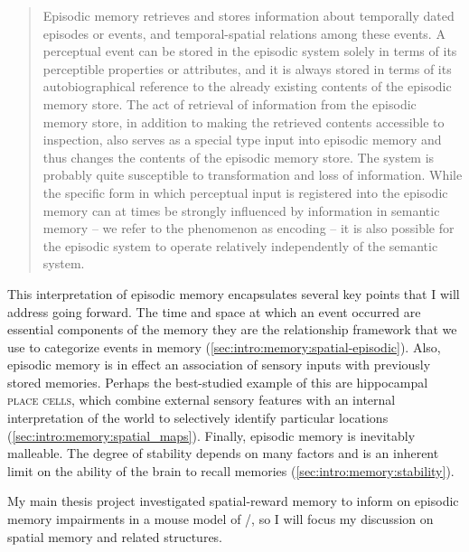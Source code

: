 
\begin{quote}
Episodic memory retrieves and stores information about temporally dated episodes or events, and temporal-spatial relations among these events. A perceptual event can be stored in the episodic system solely in terms of its perceptible properties or attributes, and it is always stored in terms of its autobiographical reference to the already existing contents of the episodic memory store. The act of retrieval of information from the episodic memory store, in addition to making the retrieved contents accessible to inspection, also serves as a special type input into episodic memory and thus changes the contents of the episodic memory store. The system is probably quite susceptible to transformation and loss of information. While the specific form in which perceptual input is registered into the episodic memory can at times be strongly influenced by information in semantic memory -- we refer to the phenomenon as encoding -- it is also possible for the episodic system to operate relatively independently of the semantic system.
\end{quote}

This interpretation of episodic memory encapsulates several key points that I will address going forward.
The time and space at which an event occurred are essential components of the memory they are the relationship framework that we use to categorize events in memory (\autoref{sec:intro:memory:spatial-episodic}).
Also, episodic memory is in effect an association of sensory inputs with previously stored memories.
Perhaps the best-studied example of this are hippocampal \textsc{place cells}, which combine external sensory features with an internal interpretation of the world to selectively identify particular locations (\autoref{sec:intro:memory:spatial_maps}).
Finally, episodic memory is inevitably malleable.
The degree of stability depends on many factors and is an inherent limit on the ability of the brain to recall memories (\autoref{sec:intro:memory:stability}).

My main thesis project investigated spatial-reward memory to inform on episodic memory impairments in a mouse model of \scz/, so I will focus my discussion on spatial memory and related structures.

